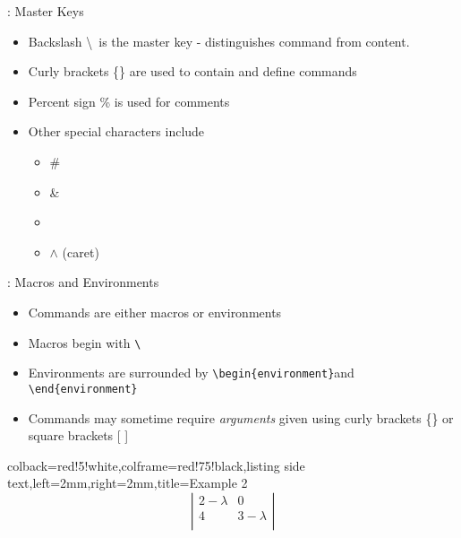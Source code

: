 \documentclass{beamer}
\begin{document}
\begin{frame}[fragile]{\insertsection : Master Keys}
    \begin{itemize}
        \item Backslash \textbackslash \, is the master key - distinguishes command from content.
        \item Curly brackets \{\} are used to contain and define commands
        \item Percent sign \% is used for comments
        \item Other special characters include
        \begin{itemize}
            \item \#
            \item \&
            \item \underline{\hspace{0.8em}}        %
            \item $\wedge$ (caret)
        \end{itemize}
    \end{itemize}
\end{frame}
\begin{frame}[fragile]{\insertsection : Macros and Environments}
    \begin{itemize}
        \item Commands are either macros or environments
        \item Macros begin with \verb|\|
        \item Environments are surrounded by \verb|\begin{environment}|and \verb|\end{environment}|
        \item Commands may sometime require \emph{arguments} given using curly brackets \{\} or square brackets [ ]
    \end{itemize}
    \begin{tcblisting}{colback=red!5!white,colframe=red!75!black,listing side text,left=2mm,right=2mm,title=Example 2}
\[
\left|
\begin{array}{cc}
     2-\lambda & 0\\
     4 & 3-\lambda\\
\end{array}
\right|
\]
    \end{tcblisting}
\end{frame}
\end{document}
